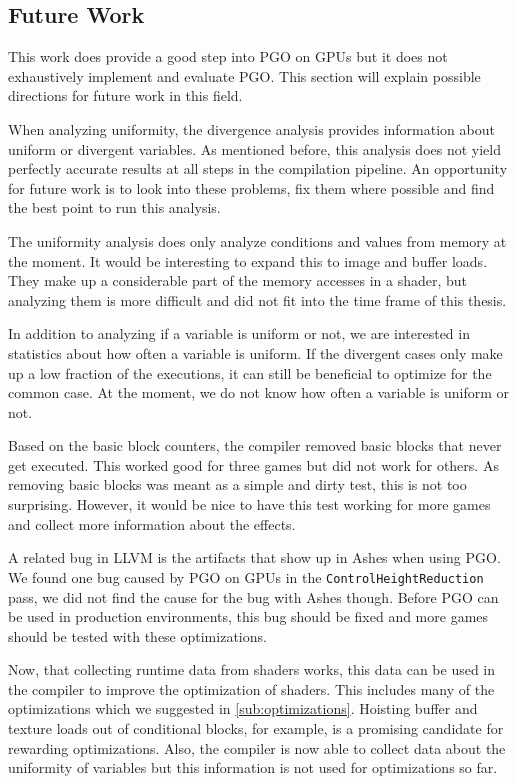 \subsection{Future Work}
\label{sub:futurework}
This work does provide a good step into PGO on GPUs but it does not exhaustively implement and evaluate PGO.
This section will explain possible directions for future work in this field.

When analyzing uniformity, the divergence analysis provides information about uniform or divergent variables.
As mentioned before, this analysis does not yield perfectly accurate results at all steps in the compilation pipeline.
An opportunity for future work is to look into these problems, fix them where possible and find the best point to run this analysis.

The uniformity analysis does only analyze conditions and values from memory at the moment.
It would be interesting to expand this to image and buffer loads.
They make up a considerable part of the memory accesses in a shader, but analyzing them is more difficult and did not fit into the time frame of this thesis.

In addition to analyzing if a variable is uniform or not, we are interested in statistics about how often a variable is uniform.
If the divergent cases only make up a low fraction of the executions, it can still be beneficial to optimize for the common case.
At the moment, we do not know how often a variable is uniform or not.

Based on the basic block counters, the compiler removed basic blocks that never get executed.
This worked good for three games but did not work for others.
As removing basic blocks was meant as a simple and dirty test, this is not too surprising.
However, it would be nice to have this test working for more games and collect more information about the effects.

A related bug in LLVM is the artifacts that show up in Ashes when using PGO.
We found one bug caused by PGO on GPUs in the \texttt{ControlHeightReduction} pass, we did not find the cause for the bug with Ashes though.
Before PGO can be used in production environments, this bug should be fixed and more games should be tested with these optimizations.

Now, that collecting runtime data from shaders works, this data can be used in the compiler to improve the optimization of shaders.
This includes many of the optimizations which we suggested in \cref{sub:optimizations}.
Hoisting buffer and texture loads out of conditional blocks, for example, is a promising candidate for rewarding optimizations.
Also, the compiler is now able to collect data about the uniformity of variables but this information is not used for optimizations so far.

